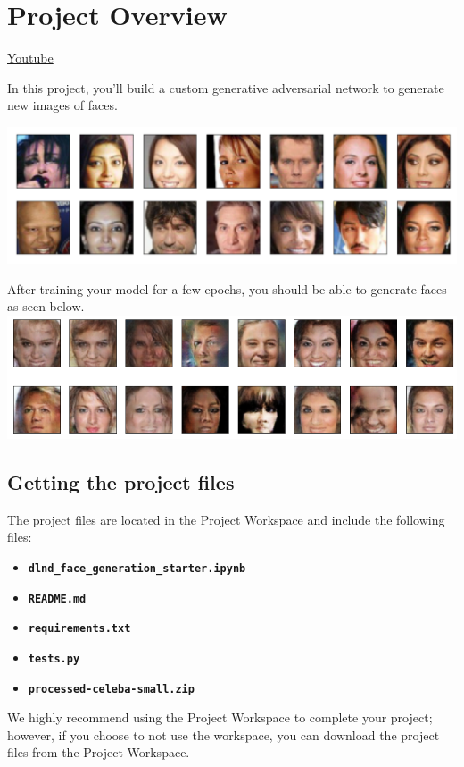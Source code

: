 \chapter{Project Overview}
\href{https://www.youtube.com/watch?v=jvJtHYBX7sM}{Youtube}

In this project, you'll build a custom generative adversarial network to generate new images of faces.

\includegraphics[width=1\linewidth]{img//genAdvNet/processed-face-data.png}

After training your model for a few epochs, you should be able to generate faces as seen below.
\includegraphics[width=1\linewidth]{img//genAdvNet/image-5.png}


\section{Getting the project files}

The project files are located in the Project Workspace and include the following files:

\begin{itemize}
    \item \textbf{\verb|dlnd_face_generation_starter.ipynb|}
    \item \textbf{\verb|README.md|}
    \item \textbf{\verb|requirements.txt|}
    \item \textbf{\verb|tests.py|}
    \item \textbf{\verb|processed-celeba-small.zip|}
\end{itemize}
We highly recommend using the Project Workspace to complete your project; however, if you choose to not use the workspace, you can download the project files from the Project Workspace.


